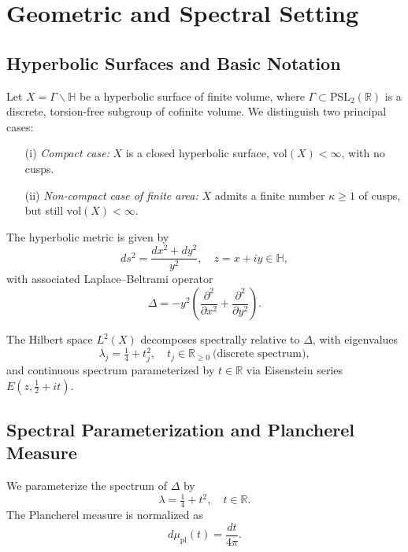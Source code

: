 
\section{Geometric and Spectral Setting}
\label{sec:geom-spectral-setting}

\subsection{Hyperbolic Surfaces and Basic Notation}

Let $X = \Gamma \backslash \mathbb{H}$ be a hyperbolic surface of finite volume, 
where $\Gamma \subset \mathrm{PSL}_2(\mathbb{R})$ is a discrete, torsion-free subgroup of cofinite volume.
We distinguish two principal cases:
\begin{enumerate}
  \item[(i)] \emph{Compact case:} $X$ is a closed hyperbolic surface, $\mathrm{vol}(X) < \infty$, with no cusps.
  \item[(ii)] \emph{Non-compact case of finite area:} $X$ admits a finite number $\kappa \geq 1$ of cusps, but still $\mathrm{vol}(X) < \infty$.
\end{enumerate}

The hyperbolic metric is given by
\[
ds^2 = \frac{dx^2 + dy^2}{y^2}, \quad z = x + iy \in \mathbb{H},
\]
with associated Laplace–Beltrami operator
\[
\Delta = -y^2 \left(\frac{\partial^2}{\partial x^2} + \frac{\partial^2}{\partial y^2}\right).
\]

The Hilbert space $L^2(X)$ decomposes spectrally relative to $\Delta$, with eigenvalues 
\[
\lambda_j = \tfrac{1}{4} + t_j^2, \quad t_j \in \mathbb{R}_{\geq 0} \ \text{(discrete spectrum)},
\]
and continuous spectrum parameterized by $t \in \mathbb{R}$ via Eisenstein series $E(z, \tfrac{1}{2} + it)$.

\subsection{Spectral Parameterization and Plancherel Measure}

\begin{definition}
\label{def:spectral-parameter}
We parameterize the spectrum of $\Delta$ by
\[
\lambda = \tfrac{1}{4} + t^2, \quad t \in \mathbb{R}.
\]
The Plancherel measure is normalized as
\[
d\mu_{\mathrm{pl}}(t) = \frac{dt}{4\pi}.
\]
\end{definition}

